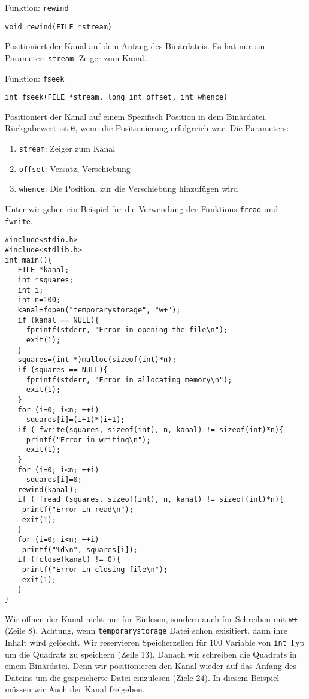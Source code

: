 \begin{myexampleblock}{Funktion: \texttt{rewind}}
\begin{lstlisting}
void rewind(FILE *stream)
\end{lstlisting}
\vspace{-0.4cm}
Positioniert der Kanal auf dem Anfang des Binärdateis.
Es hat nur ein Parameter: \texttt{stream}: Zeiger zum Kanal.
\end{myexampleblock}
\begin{myexampleblock}{Funktion: \texttt{fseek}}
\begin{lstlisting}
int fseek(FILE *stream, long int offset, int whence)
\end{lstlisting}
\vspace{-0.4cm}
Positioniert der Kanal auf einem Spezifisch Position in dem 
Binärdatei. Rückgabewert ist \texttt{0}, wenn die Positionierung erfolgreich war. Die Parameters:
\begin{enumerate}
\item \texttt{stream}: Zeiger zum Kanal
\item \texttt{offset}: Versatz, Verschiebung
\item \texttt{whence}: Die Position, zur die Verschiebung hinzufügen wird
\end{enumerate}
\end{myexampleblock}
Unter wir geben ein Beispiel für die Verwendung der Funktions \texttt{fread} und \texttt{fwrite}.
\begin{lstlisting}
#include<stdio.h>
#include<stdlib.h>
int main(){
   FILE *kanal;
   int *squares;
   int i;
   int n=100;
   kanal=fopen("temporarystorage", "w+");
   if (kanal == NULL){
     fprintf(stderr, "Error in opening the file\n");
     exit(1);
   }
   squares=(int *)malloc(sizeof(int)*n);
   if (squares == NULL){
     fprintf(stderr, "Error in allocating memory\n");
     exit(1);
   }
   for (i=0; i<n; ++i)
     squares[i]=(i+1)*(i+1);
   if ( fwrite(squares, sizeof(int), n, kanal) != sizeof(int)*n){
     printf("Error in writing\n");
     exit(1);
   }
   for (i=0; i<n; ++i)
     squares[i]=0;
   rewind(kanal); 
   if ( fread (squares, sizeof(int), n, kanal) != sizeof(int)*n){
    printf("Error in read\n");
    exit(1);
   }
   for (i=0; i<n; ++i)
    printf("%d\n", squares[i]);
   if (fclose(kanal) != 0){
    printf("Error in closing file\n");
    exit(1);
   }
}   
\end{lstlisting}
Wir öffnen der Kanal nicht nur für Einlesen, sondern auch für Schreiben mit \texttt{w+} (Zeile 8). Achtung, wenn \texttt{temporarystorage}
Datei schon exisitiert, dann ihre Inhalt wird gelöscht. Wir reservieren Speicherzellen für 100 Variable von \texttt{int} Typ 
um die Quadrats zu speichern (Zeile 13).
Danach wir schreiben die Quadrats in einem Binärdatei. Denn wir positionieren den Kanal wieder auf das Anfang des Dateins um die gespeicherte Datei 
einzulesen (Ziele 24). In diesem Beispiel müssen wir Auch der Kanal freigeben.
